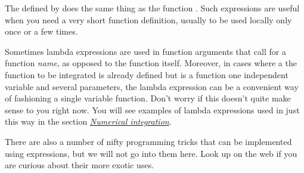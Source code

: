\documentclass[letterpaper,10pt,english]{sphinxmanual}
\begin{document}
The  defined by  does the same thing as the function .  Such  expressions are useful when you need a very short function definition, usually to be used locally only once or a few times.

Sometimes lambda expressions are used in function arguments that call for a function \emph{name}, as opposed to the function itself.  Moreover, in cases where a the function to be integrated is already defined but is a function one independent variable and several parameters, the lambda expression can be a convenient way of fashioning a single variable function.  Don't worry if this doesn't quite make sense to you right now.  You will see examples of lambda expressions used in just this way in the section {\hyperref[chap9/chap9_scipy:numericalintegration]{\emph{Numerical integration}}}.

There are also a number of nifty programming tricks that can be implemented using  expressions, but we will not go into them here.  Look up  on the web if you are curious about their more exotic uses.
\newpage
\end{document}
